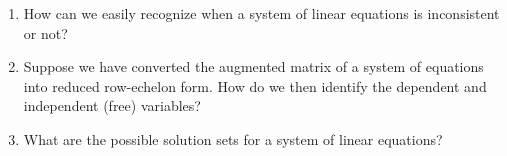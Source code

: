 \begin{enumerate}
\item How can we easily recognize when a system of linear equations is inconsistent or not?
\item Suppose we have converted the augmented matrix of a system of equations into reduced row-echelon form.  How do we then identify the dependent and independent (free) variables?
\item What are the possible solution sets for a system of linear equations?
\end{enumerate}

